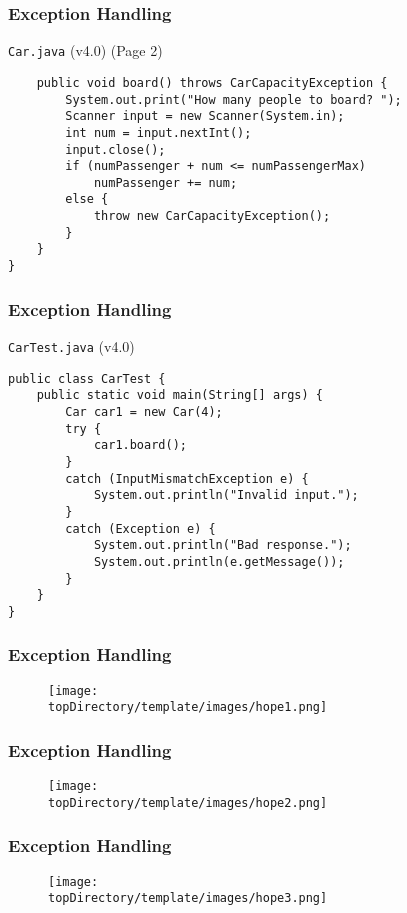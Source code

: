 \documentclass[10pt, compress]{beamer}
\begin{document}
\begin{frame}[fragile]
	\frametitle{Exception Handling}
	\begin{block}{\texttt{Car.java} (v4.0) (Page 2)}
		\begin{verbatim}
	public void board() throws CarCapacityException {
		System.out.print("How many people to board? ");
		Scanner input = new Scanner(System.in);
		int num = input.nextInt();
		input.close();
		if (numPassenger + num <= numPassengerMax)
			numPassenger += num;
		else {
			throw new CarCapacityException();
		}
	}
}
		\end{verbatim}
	\end{block}
\end{frame}

\begin{frame}[fragile]
	\frametitle{Exception Handling}
	\begin{block}{\texttt{CarTest.java} (v4.0)}
		\begin{verbatim}
public class CarTest {
	public static void main(String[] args) {
		Car car1 = new Car(4);
		try {
			car1.board();
		}
		catch (InputMismatchException e) {
			System.out.println("Invalid input.");
		}
		catch (Exception e) {
			System.out.println("Bad response.");
			System.out.println(e.getMessage());
		}
	}
}
		\end{verbatim}
	\end{block}
\end{frame}

\begin{frame}[fragile]
	\frametitle{Exception Handling}
	\begin{figure}
		\texttt{[image: \\topDirectory/template/images/hope1.png]}
	\end{figure}
\end{frame}

\begin{frame}[fragile]
	\frametitle{Exception Handling}
	\begin{figure}
		\texttt{[image: \\topDirectory/template/images/hope2.png]}
	\end{figure}
\end{frame}

\begin{frame}[fragile]
	\frametitle{Exception Handling}
	\begin{figure}
		\texttt{[image: \\topDirectory/template/images/hope3.png]}
	\end{figure}
\end{frame}

\end{document}
